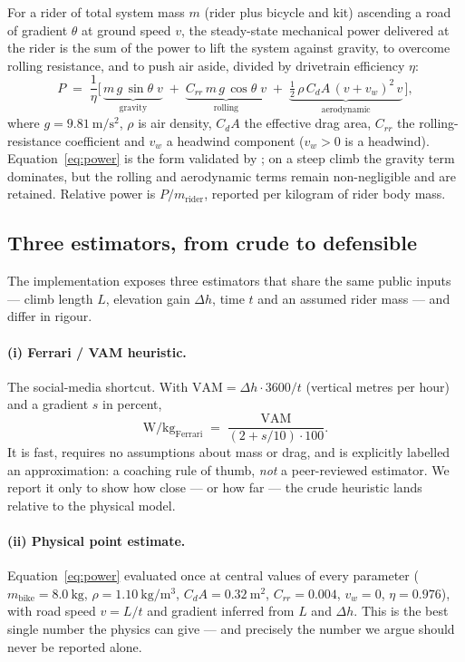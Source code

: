 \documentclass[11pt]{article}
\begin{document}
For a rider of total system mass $m$ (rider plus bicycle and kit) ascending a
road of gradient $\theta$ at ground speed $v$, the steady-state mechanical power
delivered at the rider is the sum of the power to lift the system against
gravity, to overcome rolling resistance, and to push air aside, divided by
drivetrain efficiency $\eta$:
\begin{equation}
P \;=\; \frac{1}{\eta}\Big[\,
\underbrace{m\,g\,\sin\theta\;v}_{\text{gravity}} \;+\;
\underbrace{C_{rr}\,m\,g\,\cos\theta\;v}_{\text{rolling}} \;+\;
\underbrace{\tfrac{1}{2}\,\rho\,C_dA\,(v+v_{w})^{2}\,v}_{\text{aerodynamic}}
\,\Big],
\label{eq:power}
\end{equation}
where $g=\SI{9.81}{\meter\per\second\squared}$, $\rho$ is air density, $C_dA$ the
effective drag area, $C_{rr}$ the rolling-resistance coefficient and $v_w$ a
headwind component ($v_w>0$ is a headwind). Equation~\eqref{eq:power} is the
form validated by \citet{martin1998}; on a steep climb the gravity term
dominates, but the rolling and aerodynamic terms remain non-negligible and are
retained. Relative power is $P/m_{\text{rider}}$, reported per kilogram of rider
body mass.

\subsection{Three estimators, from crude to defensible}

The implementation exposes three estimators that share the same public inputs
--- climb length $L$, elevation gain $\Delta h$, time $t$ and an assumed rider
mass --- and differ in rigour.

\paragraph{(i) Ferrari / VAM heuristic.}
The social-media shortcut. With $\mathrm{VAM}=\Delta h\cdot 3600/t$ (vertical
metres per hour) and a gradient $s$ in percent,
\begin{equation}
\text{W/kg}_{\text{Ferrari}} \;=\; \frac{\mathrm{VAM}}{(2 + s/10)\cdot 100}.
\end{equation}
It is fast, requires no assumptions about mass or drag, and is explicitly
labelled an approximation: a coaching rule of thumb, \emph{not} a peer-reviewed
estimator. We report it only to show how close --- or how far --- the crude
heuristic lands relative to the physical model.

\paragraph{(ii) Physical point estimate.}
Equation~\eqref{eq:power} evaluated once at central values of every parameter
($m_{\text{bike}}=\SI{8.0}{\kg}$, $\rho=\SI{1.10}{\kg\per\meter\cubed}$,
$C_dA=\SI{0.32}{\meter\squared}$, $C_{rr}=0.004$, $v_w=0$, $\eta=0.976$),
with road speed $v=L/t$ and gradient inferred from $L$ and $\Delta h$. This is
the best single number the physics can give --- and precisely the number we
argue should never be reported alone.
\end{document}
